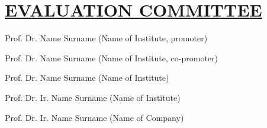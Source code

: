 \section*{\uline{EVALUATION COMMITTEE}}
\vspace{0.3cm}

\fontsize{14}{0} \selectfont Prof. Dr. Name Surname (Name of Institute, promoter)

\vspace{0.3cm}

\noindent Prof. Dr. Name Surname (Name of Institute, co-promoter)

\vspace{0.3cm}

Prof. Dr. Name Surname (Name of Institute)

\vspace{0.3cm}

Prof. Dr. Ir. Name Surname (Name of Institute)

\vspace{0.3cm}

Prof. Dr. Ir. Name Surname (Name of Company)

\clearpage\mbox{}\clearpage